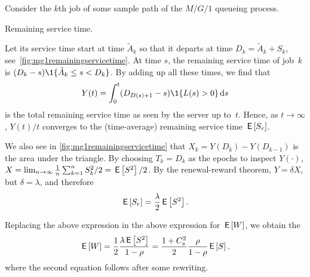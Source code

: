Consider the $k$th job of some sample path of the $M/G/1$ queueing process.
\begin{marginfigure}

 \caption{Remaining service time.}
 \label{fig:mg1remainingservicetime}
\end{marginfigure}
Let its service time start at time $\tilde A_k$ so that it departs at time $D_k=\tilde A_k + S_k$, see~\cref{fig:mg1remainingservicetime}.
At time $s$,  the remaining service time of job~$k$ is
$(D_k-s)\1{\tilde A_k \leq s < D_k}$.
By adding up all these times,  we find that
 \begin{equation*}
 Y(t) = \int_0^t (D_{D(s)+1}-s)\1{\L(s) > 0} \d s
 \end{equation*}
 is the total remaining service time as seen by the server up to~$t$.
 Hence,   as $t \to \infty$, $Y(t)/t$ converges to the  (time-average) remaining service time $\,\mathsf{E}\left[S_r\right]$.

 We also see in \cref{fig:mg1remainingservicetime} that $X_k = Y(D_k) - Y(D_{k-1})$ is the area under the triangle.
 By choosing $T_k=D_k$ as the epochs to inspect $Y(\cdot)$, $X=\lim_{n\to\infty} \frac{1}{n}\sum_{k=1}^n S_k^2/ 2 = \,\mathsf{E}\left[S^2\right]/2$.
 By the renewal-reward theorem, $Y=\delta X$, but $\delta = \lambda$, and therefore
\begin{equation*}
\,\mathsf{E}\left[S_r\right] = \frac{\lambda}2 \,\mathsf{E}\left[S^2\right].
\end{equation*}

Replacing the above expression in the above expression for $\,\mathsf{E}\left[W\right]$, we obtain the 
\begin{equation} \label{eq:710}
 \,\mathsf{E}\left[W\right] = \frac 1 2 \frac{\lambda \,\mathsf{E}\left[S^2\right]}{1-\rho} =\frac{1 + C_s^2}2 \frac{\rho}{1-\rho} \,\mathsf{E}\left[S\right],
\end{equation}
where the second equation follows after some rewriting.


